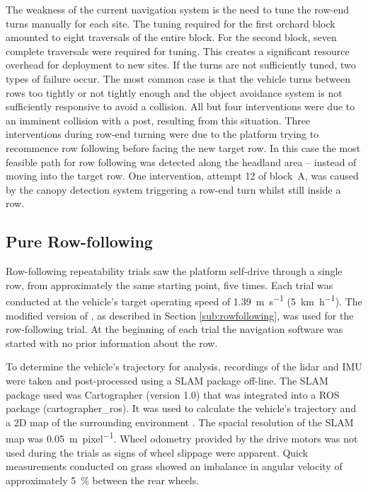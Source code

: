 \documentclass[preprint,authoryear,12pt]{elsarticle}
\begin{document}
    The weakness of the current navigation system is the need to tune the row-end turns manually for each site.
    The tuning required for the first orchard block amounted to eight traversals of the entire block.
    For the second block, seven complete traversals were required for tuning.
    This creates a significant resource overhead for deployment to new sites.
    If the turns are not sufficiently tuned, two types of failure occur.
    The most common case is that the vehicle turns between rows too tightly or not tightly enough and the object avoidance system is not sufficiently responsive to avoid a collision.
    All but four interventions were due to an imminent collision with a post, resulting from this situation.
    Three interventions during row-end turning were due to the platform trying to recommence row following before facing the new target row.
    In this case the most feasible path for row following was detected along the headland area -- instead of moving into the target row.
    One intervention, attempt 12 of block~A, was caused by the canopy detection system triggering a row-end turn whilst still inside a row.

  \subsection{Pure Row-following}
    Row-following repeatability trials saw the platform self-drive through a single row, from approximately the same starting point, five times.
    Each trial was conducted at the vehicle's target operating speed of \SI{1.39}{\meter\per\second} (\SI{5}{\kilo\meter\per\hour}).
    The modified version of \cite{Bell2016}, as described in Section \ref{sub:rowfollowing}, was used for the row-following trial.
    At the beginning of each trial the navigation software was started with no prior information about the row.

    To determine the vehicle's trajectory for analysis, recordings of the lidar and IMU were taken and post-processed using a SLAM package off-line.
    The SLAM package used was Cartographer (version 1.0) that was integrated into a ROS package (cartographer\_ros).
    It was used to calculate the vehicle's trajectory and a 2D map of the surrounding environment \citep{Hess2016}.
    The spacial resolution of the SLAM map was \SI{0.05}{\meter\per pixel}.
    Wheel odometry provided by the drive motors was not used during the trials as signs of wheel slippage were apparent.
    Quick measurements conducted on grass showed an imbalance in angular velocity of approximately \SI{5}{\percent} between the rear wheels.
\end{document}
